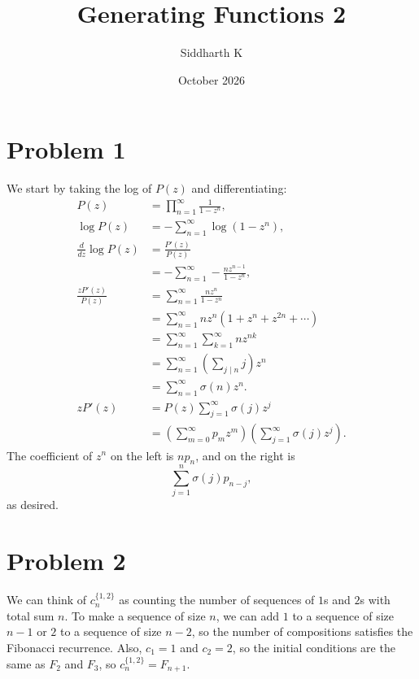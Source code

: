 \documentclass{article}
\title{Generating Functions 2}
\author{Siddharth K}
\date{October 2026}
\newcommand{\bigp}[1]{\left(#1\right)}
\begin{document}
\maketitle

\section*{Problem 1}
We start by taking the log of $P(z)$ and differentiating:
\begin{align*}
P(z) &= \prod_{n = 1}^\infty \frac{1}{1 - z^n}, \\
\log P(z) &= -\sum_{n = 1}^\infty \log (1 - z^n), \\
\frac{d}{dz}\log P(z) &= \frac{P'(z)}{P(z)} \\
&= -\sum_{n = 1}^\infty - \frac{nz^{n - 1}}{1 - z^n}, \\
\frac{zP'(z)}{P(z)} &= \sum_{n = 1}^\infty \frac{nz^n}{1 - z^n} \\
&= \sum_{n = 1}^\infty nz^n(1 + z^n + z^{2n} + \cdots) \\
&= \sum_{n = 1}^\infty \sum_{k = 1}^\infty nz^{nk} \\
&= \sum_{n = 1}^\infty \bigp{\sum_{j \mid n} j} z^n \\
&= \sum_{n = 1}^\infty \sigma(n) z^n. \\
zP'(z) &= P(z)\sum_{j = 1}^\infty \sigma(j) z^j \\
&= \bigp{\sum_{m = 0}^\infty p_mz^m}\bigp{\sum_{j = 1}^\infty \sigma(j)z^j}.
\end{align*}
The coefficient of $z^n$ on the left is $np_n$, and on the right is
$$\sum_{j = 1}^n \sigma(j) p_{n - j},$$
as desired.

\section*{Problem 2}
We can think of $c_n^{\{1, 2\}}$ as counting the number of sequences of $1$s and $2$s with total sum $n$. To make a sequence of size $n$, we can add $1$ to a sequence of size $n - 1$ or $2$ to a sequence of size $n - 2$, so the number of compositions satisfies the Fibonacci recurrence. Also, $c_1 = 1$ and $c_2 = 2$, so the initial conditions are the same as $F_2$ and $F_3$, so $c_n^{\{1, 2\}} = F_{n + 1}$.
\end{document}
